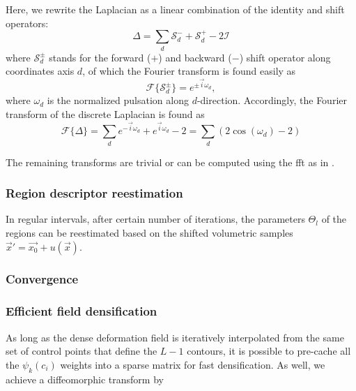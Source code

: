 Here, we rewrite the Laplacian as a linear combination of the identity and shift operators:
\begin{equation}
\Delta = \sum\limits_d \mathcal{S}_d^- + \mathcal{S}_d^+ - 2 \mathcal{I}
\end{equation}
where $\mathcal{S}_{d}^{\pm}$ stands for the forward ($+$) and backward ($-$) shift 
operator along coordinates axis $d$, of which the Fourier transform is found easily as
\begin{equation}
\mathcal{F}\{\mathcal{S}_{d}^{\pm}\} = e^{\pm \vec{i}\omega_{d}},
\end{equation}
where $\omega_{d}$ is the normalized pulsation along $d$-direction. Accordingly, the 
Fourier transform of the discrete Laplacian is found as
\begin{equation}
\mathcal{F}\{\Delta\} = \sum\limits_d e^{-\vec{i}\omega_d } + e^{\vec{i}\omega_d } - 2 = \sum\limits_d \left( 2\cos(\omega_d) - 2 \right)
\end{equation}

The remaining transforms are trivial or can be computed using the \gls{fft} 
as in \citep{estellers_efficient_2011}.

\subsubsection{Region descriptor reestimation}
In regular intervals, after certain number of iterations,
the parameters $\Theta_l$ of the regions can be reestimated 
based on the shifted volumetric samples 
$\vec{x}' = \vec{x_0} + u(\vec{x})$.

\subsubsection{Convergence}

\subsubsection{Efficient field densification}
As long as the dense deformation field is iteratively interpolated
from the same set of control points that define the $L-1$ contours,
it is possible to pre-cache all the $\psi_k(c_i)$ weights into a
sparse matrix for fast densification. As well, we achieve a 
diffeomorphic transform by
